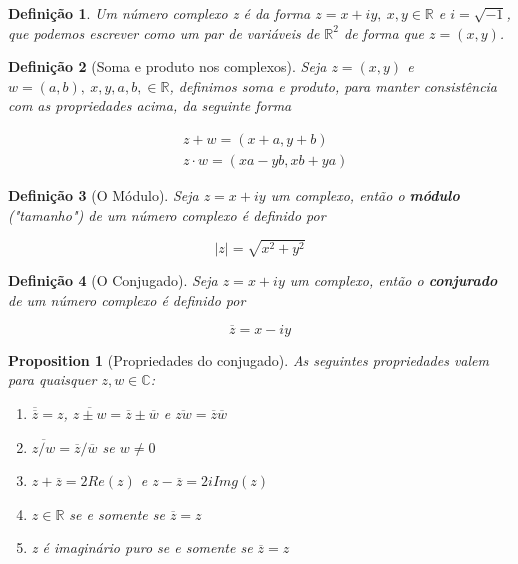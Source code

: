 \documentclass{article}
\newtheorem{prop}{Proposition}
\newtheorem{definition}{Definição}
\begin{document}
\begin{definition}
Um número complexo z é da forma $z = x + iy, \ x,y \in \mathbb{R}$ e $i = \sqrt{-1}$, que podemos escrever como um par de variáveis de $\mathbb{R}^2$ de forma que $z = (x, y)$.
\end{definition}

\begin{definition}[Soma e produto nos complexos]
Seja $z = (x, y)$ e $w = (a, b),\ x,y,a,b, \in \mathbb{R}$, definimos soma e produto, para manter consistência com as propriedades acima, da seguinte forma

\begin{align}
    &z + w = (x + a, y + b) \nonumber \\
    &z \cdot w = (xa - yb, xb + ya) \nonumber
\end{align}
\end{definition}

\begin{definition}[O Módulo]
Seja $z = x + iy$ um complexo, então o \textbf{módulo} ("tamanho") de um número complexo é definido por

$$\mid z \mid = \sqrt{x^2 + y^2}$$
\end{definition}

\begin{definition}[O Conjugado]
Seja $z = x + iy$ um complexo, então o \textbf{conjurado} de um número complexo é definido por

$$\overline{z} = x - i y$$
\end{definition}

\begin{prop}[Propriedades do conjugado] As seguintes propriedades valem para quaisquer $z, w \in \mathbb{C}$:

\begin{enumerate}[label=(\alph*)]
    \item $\overline{\overline{z}} = z$, $\overline{z \pm w} = \overline{z} \pm \overline{w}$ e $\overline{z w} = \overline{z} \overline{w}$
    
    \item $\overline{z/w} = \overline{z}/\overline{w}$ se $w \neq 0$
    
    \item $z + \overline{z} = 2 Re(z)$ e $z - \overline{z} = 2i Img(z)$
    
    \item $z \in \mathbb{R}$ se e somente se $\overline{z} = z$
    
    \item z é imaginário puro se e somente se $\overline{z} = z$
\end{enumerate}
\end{prop}
\end{document}
